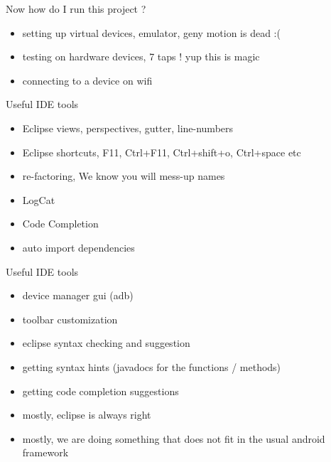 \documentclass[11pt]{beamer}
\begin{document}
\begin{frame}[containsverbatim]{Now how do I run this project ?}
	\begin{flushleft}
	\begin{itemize}
		\item setting up virtual devices, emulator, geny motion is dead :(
		\item testing on hardware devices, 7 taps ! yup this is magic
		\item connecting to a device on wifi  
	\end{itemize}
	\end{flushleft}

\end{frame}
\begin{frame}[containsverbatim]{Useful IDE tools}
	\begin{flushleft}
	\begin{itemize}
		\item Eclipse views, perspectives, gutter, line-numbers
		\item Eclipse shortcuts, F11, Ctrl+F11, Ctrl+shift+o, Ctrl+space etc
		\item re-factoring, We know you will mess-up names
		\item LogCat
		\item Code Completion
		\item auto import dependencies
		
	\end{itemize}
	\end{flushleft}
\end{frame}

\begin{frame}[containsverbatim]{Useful IDE tools}
\begin{flushleft}
	\begin{itemize}
		\item device manager gui (adb)
		\item toolbar customization
		\item eclipse syntax checking and suggestion
		\item getting syntax hints (javadocs for the functions / methods)
		\item getting code completion suggestions
		\item mostly, eclipse is always right
		\item mostly, we are doing something that does not fit in the usual android framework
	\end{itemize}
	\end{flushleft}
\end{frame}
\end{document}
